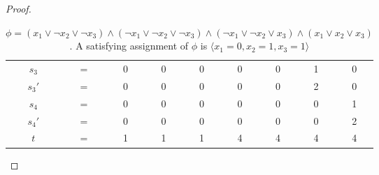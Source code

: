 \documentclass[letter]{book}
\theoremstyle{definition}
\theoremstyle{definition}
\theoremstyle{remark}
\begin{document}
\begin{proof}
\begin{enumerate}
\begin{enumerate}
\begin{table}[h]
\begin{tabular}{ccccccccc}
                            $s_3$ & = & 0 & 0 & 0 & 0 & 0 & 1 & 0\\
                            $s_3'$ & = & 0 & 0 & 0 & 0 & 0 & 2 & 0\\
                            \hline
                            $s_4$ & = & 0 & 0 & 0 & 0 & 0 & 0 & 1\\
                            $s_4'$ & = & 0 & 0 & 0 & 0 & 0 & 0 & 2\\
                            \hline\hline
                            $t$ & = & 1 & 1 & 1 & 4 & 4 & 4 & 4
                        \end{tabular}
                        \caption{$\phi=(x_1\lor\lnot{x_2}\lor\lnot{x_3})\land(\lnot{x_1}\lor\lnot{x_2}\lor\lnot{x_3})\land(\lnot{x_1}\lor\lnot{x_2}\lor{x_3})\land({x_1}\lor{x_2}\lor{x_3})$. A satisfying assignment of $\phi$ is $\langle x_1=0,x_2=1,x_3=1\rangle$}
                        \label{tab:my_label}
                    \end{table}
            \end{enumerate}
    \end{enumerate}
\end{proof}
\end{document}

